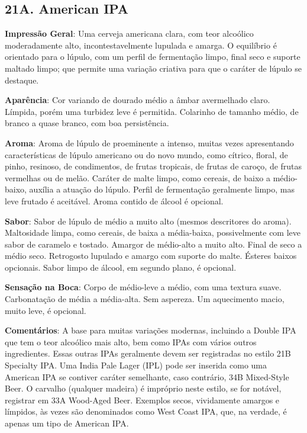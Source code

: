\subsection*{21A. American IPA}
\textbf{Impressão Geral}: Uma cerveja americana clara, com teor alcoólico moderadamente alto, incontestavelmente lupulada e amarga. O equilíbrio é orientado para o lúpulo, com um perfil de fermentação limpo, final seco e suporte maltado limpo; que permite uma variação criativa para que o caráter de lúpulo se destaque.

\textbf{Aparência}: Cor variando de dourado médio a âmbar avermelhado claro. Límpida, porém uma turbidez leve é permitida. Colarinho de tamanho médio, de branco a quase branco, com boa persistência.

\textbf{Aroma}: Aroma de lúpulo de proeminente a intenso, muitas vezes apresentando características de lúpulo americano ou do novo mundo, como cítrico, floral, de pinho, resinoso, de condimentos, de frutas tropicais, de frutas de caroço, de frutas vermelhas ou de melão. Caráter de malte limpo, como cereais, de baixo a médio-baixo, auxília a atuação do lúpulo. Perfil de fermentação geralmente limpo, mas leve frutado é aceitável. Aroma contido de álcool é opcional.

\textbf{Sabor}: Sabor de lúpulo de médio a muito alto (mesmos descritores do aroma). Maltosidade limpa, como cereais, de baixa a média-baixa, possivelmente com leve sabor de caramelo e tostado. Amargor de médio-alto a muito alto. Final de seco a médio seco. Retrogosto lupulado e amargo com suporte do malte. Ésteres baixos opcionais. Sabor limpo de álcool, em segundo plano, é opcional.

\textbf{Sensação na Boca}: Corpo de médio-leve a médio, com uma textura suave. Carbonatação de média a média-alta. Sem aspereza. Um aquecimento macio, muito leve, é opcional.

\textbf{Comentários}: A base para muitas variações modernas, incluindo a Double IPA que tem o teor alcoólico mais alto, bem como IPAs com vários outros ingredientes. Essas outras IPAs geralmente devem ser registradas no estilo 21B Specialty IPA. Uma India Pale Lager (IPL) pode ser inserida como uma American IPA se contiver caráter semelhante, caso contrário, 34B Mixed-Style Beer. O carvalho (qualquer madeira) é impróprio neste estilo, se for notável, registrar em 33A Wood-Aged Beer. Exemplos secos, vividamente amargos e límpidos, às vezes são denominados como West Coast IPA, que, na verdade, é apenas um tipo de American IPA.

